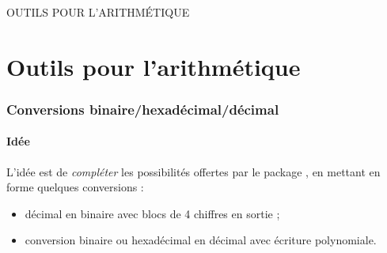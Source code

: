 \documentclass[a4paper,french,11pt]{article}
\newcommand\ctex[1]{\tcbox[vignettelatex]{#1}}
\begin{document}
\begin{PresCodePL}{}
\end{PresCodePL}
\newpage

\phantom{t}\par\vfill\par
\begin{PART}
	\begin{center}
		\Huge\MakeUppercase{Outils pour l'arithmétique}
	\end{center}
\end{PART}
\par\vfill\par\phantom{t}

\newpage

\part{Outils pour l'arithmétique}

\section{Conversions binaire/hexadécimal/décimal}\label{conversions}

\subsection{Idée}

\begin{tipblock}
L'idée est de \textit{compléter} les possibilités offertes par le package \ctex{xintbinhex}, en mettant en forme quelques conversions :

\begin{itemize}
	\item décimal en binaire avec blocs de 4 chiffres en sortie ;
	\item conversion binaire ou hexadécimal en décimal avec écriture polynomiale.
\end{itemize}
\vspace*{-\baselineskip}\leavevmode
\end{tipblock}
\end{document}
